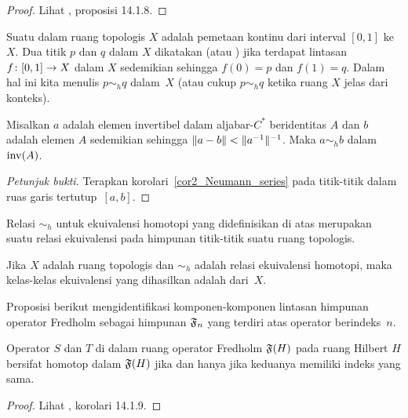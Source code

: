 \begin{proof} Lihat \cite{Wegge-Olsen:1993}, proposisi 14.1.8. \ns \end{proof}

\begin{defn}\label{004735} Suatu
 dalam ruang topologis $X$ adalah pemetaan kontinu dari interval $[0,1]$
ke~$X$. Dua titik $p$ dan $q$ dalam $X$ dikatakan
 (atau
) jika terdapat lintasan $f\colon [0,1] \rightarrow X$ dalam $X$ sedemikian sehingga
$f(0) = p$ dan $f(1) = q$. Dalam hal ini kita
menulis $p \sim_h q$ dalam~$X$ (atau cukup $p \sim_h q$ ketika ruang $X$ jelas dari konteks).
\end{defn}


\begin{exam} Misalkan $a$ adalah elemen invertibel dalam aljabar-$C^*$ beridentitas $A$ dan $b$ adalah elemen $A$
sedemikian sehingga $\lVert a - b\rVert < \lVert a^{-1}\rVert^{-1}$. Maka $a \sim_h b$ dalam~$\operatorname{inv}(A)$.
\end{exam}

\begin{proof}[\emph{Petunjuk bukti}] Terapkan korolari~\ref{cor2_Neumann_series} pada titik-titik dalam ruas garis tertutup~$[a,b]$. \ns
\end{proof}

\begin{prop}\label{K002011} Relasi $\sim_h$ untuk ekuivalensi homotopi yang didefinisikan di atas merupakan suatu relasi
ekuivalensi pada himpunan titik-titik suatu ruang topologis.
\end{prop}

\begin{defn} Jika $X$ adalah ruang topologis dan $\sim_h$ adalah relasi ekuivalensi homotopi,
maka kelas-kelas ekuivalensi yang dihasilkan adalah
 dari~$X$.
\end{defn}

Proposisi berikut mengidentifikasi komponen-komponen lintasan himpunan operator Fredholm sebagai
himpunan $\mathfrak{F}_n$ yang terdiri atas operator berindeks~$n$.

\begin{prop} Operator $S$ dan $T$ di dalam ruang operator Fredholm $\mathfrak{F}(H)$ pada
ruang Hilbert $H$ bersifat homotop dalam $\mathfrak{F}(H)$ jika dan hanya jika keduanya memiliki indeks yang sama.
\end{prop}

\begin{proof} Lihat \cite{Wegge-Olsen:1993}, korolari 14.1.9. \ns \end{proof}







\endinput
